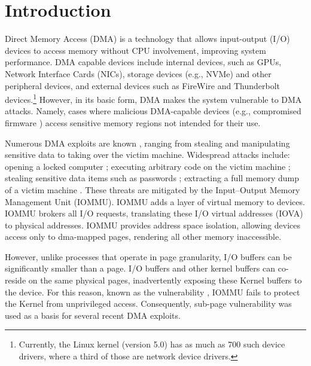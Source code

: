 \section{Introduction}

Direct Memory Access (DMA) is a technology that allows input-output (I/O) devices to access memory without CPU involvement, improving system performance.
DMA capable devices include internal devices, such as GPUs, Network Interface Cards (NICs), storage devices (e.g., NVMe) and other peripheral devices, and external devices such as FireWire and Thunderbolt devices.\footnote{Currently, the Linux kernel (version 5.0) has as much as 700 such device drivers, where a third of those are network device drivers.} However, in its basic form, DMA makes the system vulnerable to DMA attacks. Namely, cases where malicious DMA-capable devices (e.g., compromised firmware \cite{Gal14,Ben17a}) access sensitive memory regions not intended for their use. 


Numerous DMA exploits are known \cite{Dor04,BDK10,thunder}, ranging from stealing and manipulating sensitive data to taking over the victim machine. Widespread attacks include: opening a locked computer \cite{MM, Fin14}; executing arbitrary code on the victim machine \cite{Fri16, Woj08, AD10,thunder}; stealing sensitive data items such as passwords \cite{SB12, LKV13, Cim16, BR12}; extracting a full memory dump of a victim machine \cite{MM, Vol, Fin14, GA10}. These threats are mitigated by the Input–Output Memory Management Unit (IOMMU). IOMMU adds a layer of virtual memory to devices. IOMMU brokers all I/O requests, translating these I/O virtual addresses (IOVA) to physical addresses. IOMMU provides address space isolation, allowing devices access only to dma-mapped pages, rendering all other memory inaccessible.

However, unlike processes that operate in page granularity, I/O buffers can be significantly smaller than a page. I/O buffers and other kernel buffers can co-reside on the same physical pages, inadvertently exposing these Kernel buffers to the device. For this reason, known as the \subpage{} vulnerability \cite{MMT16,thunder}, IOMMU fails to protect the Kernel from unprivileged access. Consequently, sub-page vulnerability was used as a basis for several recent DMA exploits. 

